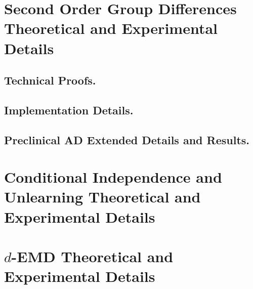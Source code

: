 
\chapter{Second Order Group Differences Theoretical and Experimental Details}
\section{Technical Proofs.}

\section{Implementation Details.}


\section{Preclinical AD Extended Details and Results.}



%
\chapter{Conditional Independence and Unlearning Theoretical and Experimental Details}





\chapter{$d$-EMD Theoretical and Experimental Details}









